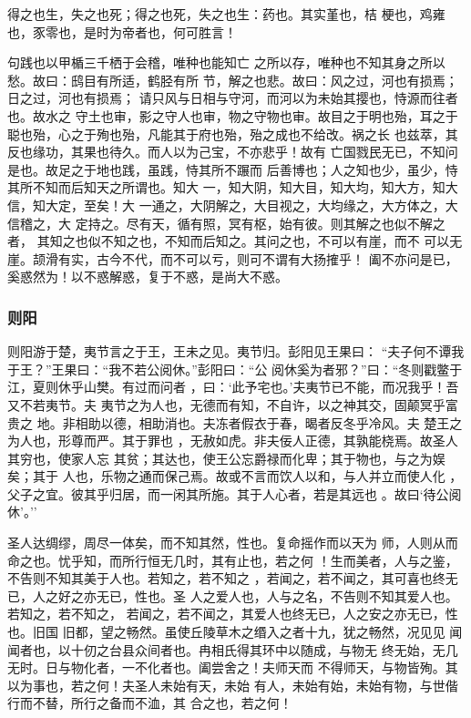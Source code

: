 \documentclass[]{article}
\begin{document}
得之也生，失之也死；得之也死，失之也生：药也。其实堇也，桔
梗也，鸡雍也，豕零也，是时为帝者也，何可胜言！

句践也以甲楯三千栖于会稽，唯种也能知亡
之所以存，唯种也不知其身之所以愁。故曰：鸱目有所适，鹤胫有所
节，解之也悲。故曰：风之过，河也有损焉；日之过，河也有损焉；
请只风与日相与守河，而河以为未始其撄也，恃源而往者也。故水之
守土也审，影之守人也审，物之守物也审。故目之于明也殆，耳之于
聪也殆，心之于殉也殆，凡能其于府也殆，殆之成也不给改。祸之长
也兹萃，其反也缘功，其果也待久。而人以为己宝，不亦悲乎！故有
亡国戮民无已，不知问是也。故足之于地也践，虽践，恃其所不蹍而
后善博也；人之知也少，虽少，恃其所不知而后知天之所谓也。知大
一，知大阴，知大目，知大均，知大方，知大信，知大定，至矣！大
一通之，大阴解之，大目视之，大均缘之，大方体之，大信稽之，大
定持之。尽有天，循有照，冥有枢，始有彼。则其解之也似不解之者，
其知之也似不知之也，不知而后知之。其问之也，不可以有崖，而不
可以无崖。颉滑有实，古今不代，而不可以亏，则可不谓有大扬搉乎！
阖不亦问是已，奚惑然为！以不惑解惑，复于不惑，是尚大不惑。

\hypertarget{header-n2320}{%
\subsubsection{则阳}\label{header-n2320}}

则阳游于楚，夷节言之于王，王未之见。夷节归。彭阳见王果曰：
``夫子何不谭我于王？''王果曰：``我不若公阅休。''彭阳曰：``公
阅休奚为者邪？''曰：``冬则戳鳖于江，夏则休乎山樊。有过而问者
，曰：`此予宅也。'夫夷节已不能，而况我乎！吾又不若夷节。夫
夷节之为人也，无德而有知，不自许，以之神其交，固颠冥乎富贵之
地。非相助以德，相助消也。夫冻者假衣于春，暍者反冬乎冷风。夫
楚王之为人也，形尊而严。其于罪也
，无赦如虎。非夫佞人正德，其孰能桡焉。故圣人其穷也，使家人忘
其贫；其达也，使王公忘爵禄而化卑；其于物也，与之为娱矣；其于
人也，乐物之通而保己焉。故或不言而饮人以和，与人并立而使人化
，父子之宜。彼其乎归居，而一闲其所施。其于人心者，若是其远也
。故曰`待公阅休'。''

圣人达绸缪，周尽一体矣，而不知其然，性也。复命摇作而以天为
师，人则从而命之也。忧乎知，而所行恒无几时，其有止也，若之何
！生而美者，人与之鉴，不告则不知其美于人也。若知之，若不知之
，若闻之，若不闻之，其可喜也终无已，人之好之亦无已，性也。圣
人之爱人也，人与之名，不告则不知其爱人也。若知之，若不知之，
若闻之，若不闻之，其爱人也终无已，人之安之亦无已，性也。旧国
旧都，望之畅然。虽使丘陵草木之缗入之者十九，犹之畅然，况见见
闻闻者也，以十仞之台县众间者也。冉相氏得其环中以随成，与物无
终无始，无几无时。日与物化者，一不化者也。阖尝舍之！夫师天而
不得师天，与物皆殉。其以为事也，若之何！夫圣人未始有天，未始
有人，未始有始，未始有物，与世偕行而不替，所行之备而不洫，其
合之也，若之何！
\end{document}

